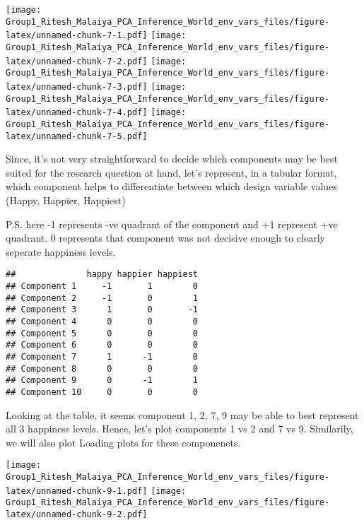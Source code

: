 \documentclass[]{article}
\newenvironment{Shaded}{\begin{snugshade}}{\end{snugshade}}
\newcommand{\KeywordTok}[1]{\textcolor[rgb]{0.13,0.29,0.53}{\textbf{#1}}}
\newcommand{\NormalTok}[1]{#1}
\newcommand{\OperatorTok}[1]{\textcolor[rgb]{0.81,0.36,0.00}{\textbf{#1}}}
\newcommand{\StringTok}[1]{\textcolor[rgb]{0.31,0.60,0.02}{#1}}
\begin{document}
\begin{Shaded}
\end{Shaded}

\texttt{[image: Group1\_Ritesh\_Malaiya\_PCA\_Inference\_World\_env\_vars\_files/figure-latex/unnamed-chunk-7-1.pdf]}
\texttt{[image: Group1\_Ritesh\_Malaiya\_PCA\_Inference\_World\_env\_vars\_files/figure-latex/unnamed-chunk-7-2.pdf]}
\texttt{[image: Group1\_Ritesh\_Malaiya\_PCA\_Inference\_World\_env\_vars\_files/figure-latex/unnamed-chunk-7-3.pdf]}
\texttt{[image: Group1\_Ritesh\_Malaiya\_PCA\_Inference\_World\_env\_vars\_files/figure-latex/unnamed-chunk-7-4.pdf]}
\texttt{[image: Group1\_Ritesh\_Malaiya\_PCA\_Inference\_World\_env\_vars\_files/figure-latex/unnamed-chunk-7-5.pdf]}

Since, it's not very straightforward to decide which components may be
best suited for the research question at hand, let's represent, in a
tabular format, which component helps to differentiate between which
design variable values (Happy, Happier, Happiest)

P.S. here -1 represents -ve quadrant of the component and +1 represent
+ve quadrant. 0 represents that component was not decisive enough to
clearly seperate happiness levels.

\begin{verbatim}
##              happy happier happiest
## Component 1     -1       1        0
## Component 2     -1       0        1
## Component 3      1       0       -1
## Component 4      0       0        0
## Component 5      0       0        0
## Component 6      0       0        0
## Component 7      1      -1        0
## Component 8      0       0        0
## Component 9      0      -1        1
## Component 10     0       0        0
\end{verbatim}

Looking at the table, it seems component 1, 2, 7, 9 may be able to best
represent all 3 happiness levels. Hence, let's plot components 1 vs 2
and 7 vs 9. Similarily, we will also plot Loading plots for these
componenets.

\texttt{[image: Group1\_Ritesh\_Malaiya\_PCA\_Inference\_World\_env\_vars\_files/figure-latex/unnamed-chunk-9-1.pdf]}
\texttt{[image: Group1\_Ritesh\_Malaiya\_PCA\_Inference\_World\_env\_vars\_files/figure-latex/unnamed-chunk-9-2.pdf]}
\end{document}
